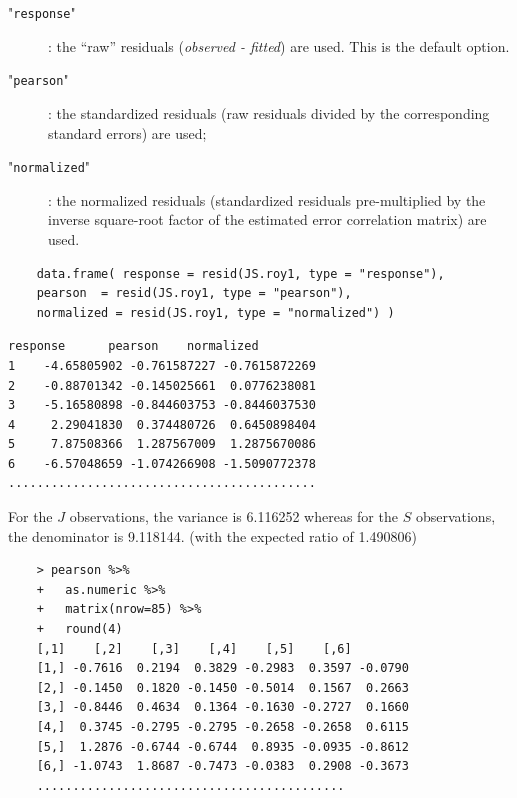 \documentclass[Main.tex]{subfiles}
\begin{document}
\begin{description}
	\item["\texttt{response}"]: the “raw” residuals (\textit{observed - fitted}) are used. This is the default option.
	\item["\texttt{pearson}"]: the standardized residuals (raw residuals divided by the corresponding standard errors) are used; 
	\item["\texttt{normalized}"]: the normalized residuals (standardized residuals pre-multiplied by the inverse square-root factor of the estimated error correlation matrix) are used.
\end{description}

\begin{framed}
	\begin{verbatim}
	data.frame( response = resid(JS.roy1, type = "response"), 
	pearson  = resid(JS.roy1, type = "pearson"), 
	normalized = resid(JS.roy1, type = "normalized") )
	\end{verbatim}
\end{framed}

\begin{verbatim}
response      pearson    normalized
1    -4.65805902 -0.761587227 -0.7615872269
2    -0.88701342 -0.145025661  0.0776238081
3    -5.16580898 -0.844603753 -0.8446037530
4     2.29041830  0.374480726  0.6450898404
5     7.87508366  1.287567009  1.2875670086
6    -6.57048659 -1.074266908 -1.5090772378
...........................................
\end{verbatim}
For the $J$ observations, the variance is 6.116252 whereas for the $S$ observations, the denominator is 9.118144. (with the expected ratio of  1.490806)


\begin{framed}
	\begin{verbatim}
	> pearson %>%
	+   as.numeric %>% 
	+   matrix(nrow=85) %>%
	+   round(4) 
	[,1]    [,2]    [,3]    [,4]    [,5]    [,6]
	[1,] -0.7616  0.2194  0.3829 -0.2983  0.3597 -0.0790
	[2,] -0.1450  0.1820 -0.1450 -0.5014  0.1567  0.2663
	[3,] -0.8446  0.4634  0.1364 -0.1630 -0.2727  0.1660
	[4,]  0.3745 -0.2795 -0.2795 -0.2658 -0.2658  0.6115
	[5,]  1.2876 -0.6744 -0.6744  0.8935 -0.0935 -0.8612
	[6,] -1.0743  1.8687 -0.7473 -0.0383  0.2908 -0.3673
	...........................................
	
	\end{verbatim}
\end{framed}
\end{document}
